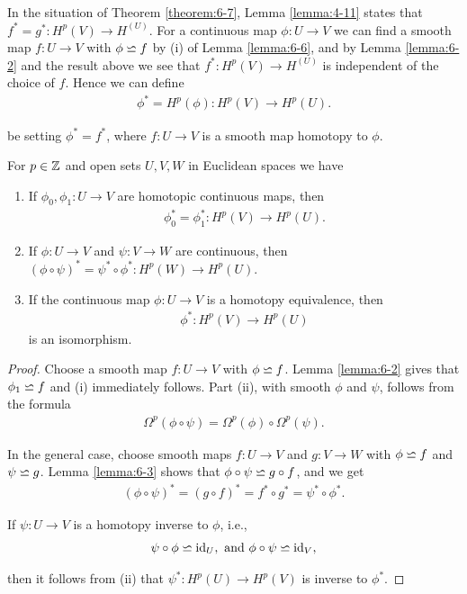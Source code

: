 In the situation of Theorem \ref{theorem:6-7}, Lemma \ref{lemma:4-11} states that 
$f^* = g^*: H^p(V)\to H^(U)$. For a continuous map $\phi: U\to V$ we can find a smooth map 
$f:U\to V$ with $\phi\backsimeq f$ by (i) of Lemma \ref{lemma:6-6}, and by Lemma \ref{lemma:6-2} and the result 
above we see that $f^*: H^p(V)\to H^(U)$ is independent of the choice of $f$. Hence we can define
\begin{align*}
  \phi^* = H^p(\phi): H^p(V)\to H^p(U).
\end{align*}

be setting $\phi^* = f^*$, where $f:U\to V$ is a smooth map homotopy to $\phi$.


\begin{theorem}\label{theorem:6-8}
For $p\in\mathbb{Z}$ and open sets $U, V, W$ in Euclidean spaces we have 
\begin{enumerate}[label=(\roman*)]
  \item If $\phi_0, \phi_1:U\to V$ are homotopic continuous maps, then 
    \begin{align*}
      \phi_0^* = \phi_1^*: H^p(V)\to H^p(U).
    \end{align*}
  \item If $\phi:U\to V$ and $\psi:V\to W$ are continuous, then $(\phi\circ\psi)^* = \psi^*\circ\phi^*: H^p(W)\to H^p(U)$. 
  \item If the continuous map $\phi:U\to V$ is a homotopy equivalence, then 
    \begin{align*}
      \phi^*: H^p(V)\to H^p(U)
    \end{align*}
    is an isomorphism.
\end{enumerate}
\end{theorem}


\begin{proof}
Choose a smooth map $f:U\to V$ with $\phi\backsimeq f$. Lemma \ref{lemma:6-2} gives that
$\phi_1\backsimeq f$ and (i) immediately follows. Part (ii), with smooth $\phi$ and $\psi$, follows
from the formula
\begin{align*}
  \Omega^p(\phi\circ\psi) = \Omega^p(\phi)\circ\Omega^p(\psi).
\end{align*}

In the general case, choose smooth maps $f:U\to V$ and $g:V\to W$ with $\phi\backsimeq f$ and $\psi\backsimeq g$. Lemma \ref{lemma:6-3}
shows that $\phi\circ\psi\backsimeq g\circ f$, and we get 
\begin{align*}
  (\phi\circ\psi)^* = (g\circ f)^* = f^*\circ g^* = \psi^*\circ\phi^*.
\end{align*}

If $\psi:U\to V$ is a homotopy inverse to $\phi$, i.e.,
\begin{align*}
  \psi\circ\phi\backsimeq\operatorname{id}_U, \text{ and } \phi\circ\psi\backsimeq\operatorname{id}_V,
\end{align*}

then it follows from (ii) that $\psi^*:H^p(U)\to H^p(V)$ is inverse to $\phi^*$.
\end{proof}

